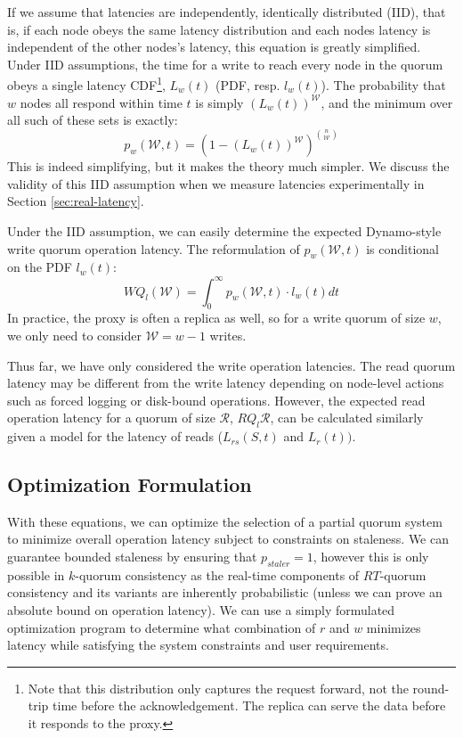\documentclass{vldb}
\begin{document}
If we assume that latencies are independently, identically distributed
(IID), that is, if each node obeys the same latency distribution and
each nodes latency is independent of the other nodes's latency, this
equation is greatly simplified.  Under IID assumptions, the time for a
write to reach every node in the quorum obeys a single latency
CDF\footnote{Note that this distribution only captures the request
  forward, not the round-trip time before the acknowledgement.  The
  replica can serve the data before it responds to the proxy.},
$L_w(t)$ (PDF, resp. $l_w(t)$).  The probability that $w$ nodes all
respond within time $t$ is simply $(L_w(t))^\mathcal{W}$, and the
minimum over all such of these sets is exactly:
\begin{equation}
p_w(\mathcal{W}, t) = (1-(L_w(t))^\mathcal{W})^{n \choose \mathcal{W}}
\end{equation}
This is indeed simplifying, but it makes the theory much simpler.  We
discuss the validity of this IID assumption when we measure latencies
experimentally in Section \ref{sec:real-latency}.

Under the IID assumption, we can easily determine the expected
Dynamo-style write quorum operation latency. The reformulation of
$p_w(\mathcal{W}, t)$ is conditional on the PDF $l_w(t)$:
\begin{equation}
WQ_l(\mathcal{W}) = \int_0^{\infty} p_w(\mathcal{W}, t) \cdot l_w(t) dt
\end{equation}
In practice, the proxy is often a replica as well, so for a write
quorum of size $w$, we only need to consider $\mathcal{W}=w-1$ writes.

Thus far, we have only considered the write operation latencies.  The
read quorum latency may be different from the write latency depending
on node-level actions such as forced logging or disk-bound operations.
However, the expected read operation latency for a quorum of size
$\mathcal{R}$, $RQ_l{\mathcal{R}}$, can be calculated similarly given a
model for the latency of reads ($L_{rs}(S,t)$ and $L_r(t))$.

\subsection{Optimization Formulation}

With these equations, we can optimize the selection of a partial
quorum system to minimize overall operation latency subject to
constraints on staleness. We can guarantee bounded staleness by
ensuring that $p_{staler} = 1$, however this is only possible in
$k$-quorum consistency as the real-time components of $RT$-quorum
consistency and its variants are inherently probabilistic (unless we
can prove an absolute bound on operation latency).  We can use a
simply formulated optimization program to determine what combination
of $r$ and $w$ minimizes latency while satisfying the system
constraints and user requirements.
\end{document}
